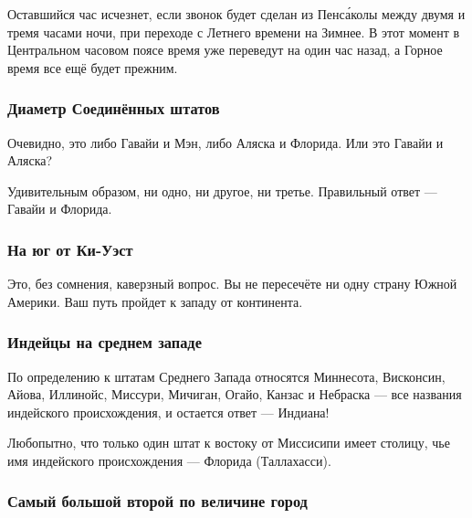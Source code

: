 Оставшийся час исчезнет, если звонок будет сделан  из Пенс\'{а}колы между двумя и тремя часами ночи, при переходе с Летнего времени на Зимнее. 
В этот момент в Центральном часовом поясе время уже переведут на один  час назад, а Горное время все ещё  будет прежним.\heart   


                            
                                                                                                                                     
\subsubsection*{Диаметр Соединённых штатов}%


Очевидно, это либо Гавайи и Мэн, либо Аляска и Флорида. Или это Гавайи и Аляска?

\medskip

Удивительным образом, ни одно, ни другое, ни третье.  Правильный ответ --- Гавайи и Флорида.\heart




\subsubsection*{На юг от Ки-Уэст}%


Это, без сомнения, каверзный  вопрос. %
Вы не пересечёте ни одну страну Южной Америки. 
Ваш путь пройдет к западу от континента. 
\heart


\subsubsection*{Индейцы на среднем западе}%


По определению к штатам  Среднего Запада относятся Миннесота, Висконсин, Айова,
Иллинойс, Миссури, Мичиган, Огайо, Канзас и Небраска --- все названия индейского
происхождения, и остается ответ --- Индиана!\heart


Любопытно, что только один штат к востоку от Миссисипи имеет столицу, чье имя индейского происхождения --- Флорида (Таллахасси).




\subsubsection*{Самый большой второй по величине город}%


